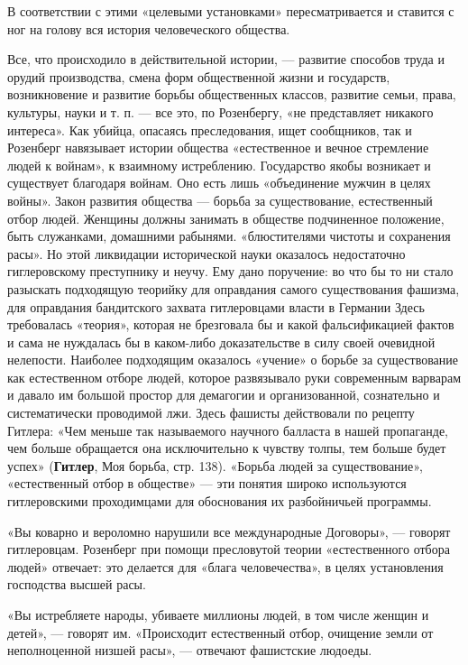 \documentclass[12pt, a4paper, openany]{book}
\begin{document}
В соответствии с этими «целевыми установками» пересматривается и ставится с ног на голову вся история человеческого общества.

Все, что происходило в действительной истории, — развитие способов труда и орудий производства, смена форм общественной жизни и государств, возникновение и развитие борьбы общественных классов, развитие семьи, права, культуры, науки и т. п. — все это, по Розенбергу, «не представляет никакого интереса». Как убийца, опасаясь преследования, ищет сообщников, так и Розенберг навязывает истории общества «естественное и вечное стремление людей к войнам», к взаимному истреблению. Государство якобы возникает и существует благодаря войнам. Оно есть лишь «объединение мужчин в целях войны». Закон развития общества — борьба за существование, естественный отбор людей. Женщины должны занимать в обществе подчиненное положение, быть служанками, домашними рабынями. «блюстителями чистоты и сохранения расы». Но этой ликвидации исторической науки оказалось недостаточно гиглеровскому преступнику и неучу. Ему дано поручение: во что бы то ни стало разыскать подходящую теорийку для оправдания самого существования фашизма, для оправдания бандитского захвата гитлеровцами власти в Германии Здесь требовалась «теория», которая не брезговала бы и какой фальсификацией фактов и сама не нуждалась бы в каком-либо доказательстве в силу своей очевидной нелепости. Наиболее подходящим оказалось «учение» о борьбе за существование как естественном отборе людей, которое развязывало руки современным варварам и давало им большой простор для демагогии и организованной, сознательно и систематически проводимой лжи. Здесь фашисты действовали по рецепту Гитлера: «Чем меньше так называемого научного балласта в нашей пропаганде, чем больше обращается она исключительно к чувству толпы, тем больше будет успех» (\textbf{Гитлер}, Моя борьба, стр. 138). «Борьба людей за существование», «естественный отбор в обществе» — эти понятия широко используются гитлеровскими проходимцами для обоснования их разбойничьей программы.

«Вы коварно и вероломно нарушили все международные Договоры», — говорят гитлеровцам. Розенберг при помощи пресловутой теории «естественного отбора людей» отвечает: это делается для «блага человечества», в целях установления господства высшей расы.

«Вы истребляете народы, убиваете миллионы людей, в том числе женщин и детей», — говорят им. «Происходит естественный отбор, очищение земли от неполноценной низшей расы», — отвечают фашистские людоеды.
\end{document}
